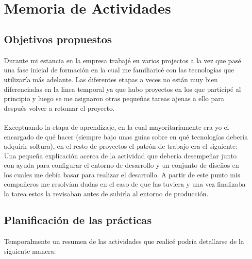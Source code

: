 \documentclass[10pt, a4paper,spanish]{article}
\begin{document}
    \section{Memoria de Actividades}

        \subsection{Objetivos propuestos}

            \paragraph{}
            Durante mi estancia en la empresa trabajé en varios projectos a la vez que pasé una fase inicial de formación en la cual me familiaricé con las tecnologías que utilizaría más adelante. Las diferentes etapas a veces no están muy bien diferenciadas en la linea temporal ya que hubo proyectos en los que participé al principio y luego se me asignaron otras pequeñas tareas ajenas a ello para después volver a retomar el proyecto.

            \paragraph{}
            Exceptuando la etapa de aprendizaje, en la cual mayoritariamente era yo el encargado de qué hacer (siempre bajo unas guías sobre en qué tecnologías debería adquirir soltura), en el resto de proyectos el patrón de trabajo era el siguiente: Una pequeña explicación acerca de la actividad que debería desempeñar junto con ayuda para configurar el entorno de desarrollo y un conjunto de diseños en los cuales me debía basar para realizar el desarrollo. A partir de este punto mis compañeros me resolvían dudas en el caso de que las tuviera y una vez finalizaba la tarea estos la revisaban antes de subirla al entorno de producción.


        \subsection{Planificación de las prácticas}

            \paragraph{}
            Temporalmente un resumen de las actividades que realicé podría detallarse de la siguiente manera:
\end{document}

